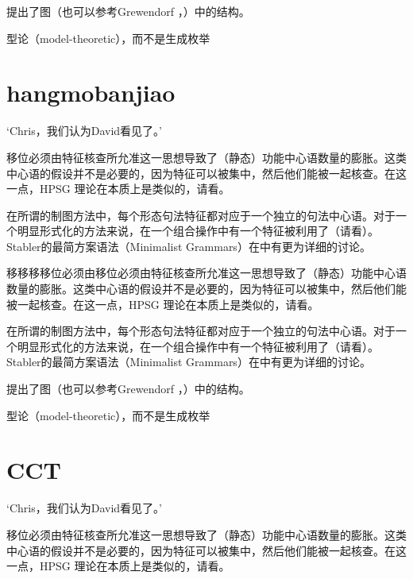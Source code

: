 \documentclass{scrbook}
\let\citew\citealp
\newcommand{\page}{}
\begin{document}
\citet[\page 297]{Rizzi97a-u}提出了图（也可以参考Grewendorf \citeyear[\page 85, 240]{Grewendorf2002a}，\citeyear{Grewendorf2009a}）中的结构。

型论（model-theoretic），而不是生成枚举


\section{hangmobanjiao}


    `Chris，我们认为David看见了。'

移位必须由特征核查所允准这一思想导致了（静态）功能中心语数量的膨胀。这类中心语的假设并不是必要的，因为特征可以被集中，然后他们能被一起核查。在这一点，HPSG 理论在本质上是类似的，请看\citew[\S~II.3.3.4, \S~II.4.2]{Sternefeld2006a-u}。

在所谓的制图方法中，每个形态句法特征都对应于一个独立的句法中心语\citep[\page 54, 61]{CR2010a}。对于一个明显形式化的方法来说，在一个组合操作中有一个特征被利用了（请看\citew[\page 335]{Stabler2001a}）。Stabler的最简方案语法（Minimalist Grammars）在中有更为详细的讨论。

移移移移位必须由移位必须由特征核查所允准这一思想导致了（静态）功能中心语数量的膨胀。这类中心语的假设并不是必要的，因为特征可以被集中，然后他们能被一起核查。在这一点，HPSG 理论在本质上是类似的，请看\citew[\S~II.3.3.4, \S~II.4.2]{Sternefeld2006a-u}。

在所谓的制图方法中，每个形态句法特征都对应于一个独立的句法中心语\citep[\page 54, 61]{CR2010a}。对于一个明显形式化的方法来说，在一个组合操作中有一个特征被利用了（请看\citew[\page 335]{Stabler2001a}）。Stabler的最简方案语法（Minimalist Grammars）在中有更为详细的讨论。

\citet[\page 297]{Rizzi97a-u}提出了图（也可以参考Grewendorf \citeyear[\page 85, 240]{Grewendorf2002a}，\citeyear{Grewendorf2009a}）中的结构。

型论（model-theoretic），而不是生成枚举


\section{CCT}

    `Chris，我们认为David看见了。'

移位必须由特征核查所允准这一思想导致了（静态）功能中心语数量的膨胀。这类中心语的假设并不是必要的，因为特征可以被集中，然后他们能被一起核查。在这一点，HPSG 理论在本质上是类似的，请看\citew[\S~II.3.3.4, \S~II.4.2]{Sternefeld2006a-u}。
\end{document}
